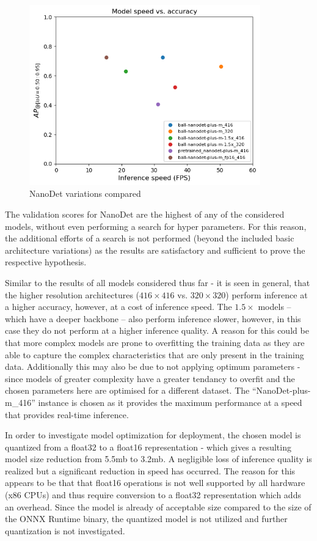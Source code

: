 \documentclass[a4paper,twoside,12pt]{report}
\begin{document}
\begin{figure}[h!]
\begin{center}
\includegraphics[width=10cm]{images/nanodet_compare.png}
\caption{NanoDet variations compared}
\label{fig:nanodet_compare}
\end{center}
\end{figure}

The validation scores for NanoDet are the highest of any of the considered models, without even performing a search for hyper parameters. For this reason, the additional efforts of a search is not performed (beyond the included basic architecture variations) as the results are satisfactory and sufficient to prove the respective hypothesis. 

Similar to the results of all models considered thus far - it is seen in general, that the higher resolution architectures ($416 \times 416$ vs. $320 \times 320$) perform inference at a higher accuracy, however, at a cost of inference speed. The $1.5\times$ models -- which have a deeper backbone -- also perform inference slower, however, in this case they do not perform at a higher inference quality. A reason for this could be that more complex models are prone to overfitting the training data as they are able to capture the complex characteristics that are only present in the training data. Additionally this may also be due to not applying optimum parameters - since models of greater complexity have a greater tendancy to overfit and the chosen parameters here are optimised for a different dataset. The ``NanoDet-plus-m\_416'' instance is chosen as it provides the maximum performance at a speed that provides real-time inference.

In order to investigate model optimization for deployment, the chosen model is quantized from a float32 to a float16 representation - which gives a resulting model size reduction from 5.5mb to 3.2mb. A negligible loss of inference quality is realized but a significant reduction in speed has occurred. The reason for this appears to be that that float16 operations is not well supported by all hardware (x86 CPUs) and thus require conversion to a float32 representation which adds an overhead. Since the model is already of acceptable size compared to the size of the ONNX Runtime binary, the quantized model is not utilized and further quantization is not investigated.
\end{document}
